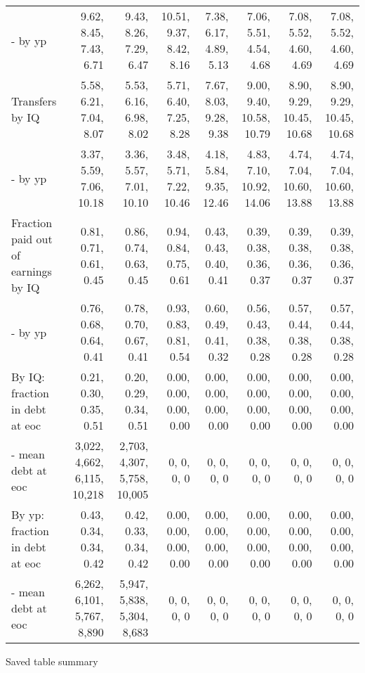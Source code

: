 \begin{tabular}{lrrrrrrr}
- by yp & 9.62, 8.45, 7.43, 6.71  & 9.43, 8.26, 7.29, 6.47  & 10.51, 9.37, 8.42, 8.16  & 7.38, 6.17, 4.89, 5.13  & 7.06, 5.51, 4.54, 4.68  & 7.08, 5.52, 4.60, 4.69  & 7.08, 5.52, 4.60, 4.69  \\ 
Transfers by IQ & 5.58, 6.21, 7.04, 8.07  & 5.53, 6.16, 6.98, 8.02  & 5.71, 6.40, 7.25, 8.28  & 7.67, 8.03, 9.28, 9.38  & 9.00, 9.40, 10.58, 10.79  & 8.90, 9.29, 10.45, 10.68  & 8.90, 9.29, 10.45, 10.68  \\ 
- by yp & 3.37, 5.59, 7.06, 10.18  & 3.36, 5.57, 7.01, 10.10  & 3.48, 5.71, 7.22, 10.46  & 4.18, 5.84, 9.35, 12.46  & 4.83, 7.10, 10.92, 14.06  & 4.74, 7.04, 10.60, 13.88  & 4.74, 7.04, 10.60, 13.88  \\ 
Fraction paid out of earnings by IQ & 0.81, 0.71, 0.61, 0.45  & 0.86, 0.74, 0.63, 0.45  & 0.94, 0.84, 0.75, 0.61  & 0.43, 0.43, 0.40, 0.41  & 0.39, 0.38, 0.36, 0.37  & 0.39, 0.38, 0.36, 0.37  & 0.39, 0.38, 0.36, 0.37  \\ 
- by yp & 0.76, 0.68, 0.64, 0.41  & 0.78, 0.70, 0.67, 0.41  & 0.93, 0.83, 0.81, 0.54  & 0.60, 0.49, 0.41, 0.32  & 0.56, 0.43, 0.38, 0.28  & 0.57, 0.44, 0.38, 0.28  & 0.57, 0.44, 0.38, 0.28  \\ 
By IQ: fraction in debt at eoc & 0.21, 0.30, 0.35, 0.51  & 0.20, 0.29, 0.34, 0.51  & 0.00, 0.00, 0.00, 0.00  & 0.00, 0.00, 0.00, 0.00  & 0.00, 0.00, 0.00, 0.00  & 0.00, 0.00, 0.00, 0.00  & 0.00, 0.00, 0.00, 0.00  \\ 
- mean debt at eoc & 3,022, 4,662, 6,115, 10,218  & 2,703, 4,307, 5,758, 10,005  & 0, 0, 0, 0  & 0, 0, 0, 0  & 0, 0, 0, 0  & 0, 0, 0, 0  & 0, 0, 0, 0  \\ 
By yp: fraction in debt at eoc & 0.43, 0.34, 0.34, 0.42  & 0.42, 0.33, 0.34, 0.42  & 0.00, 0.00, 0.00, 0.00  & 0.00, 0.00, 0.00, 0.00  & 0.00, 0.00, 0.00, 0.00  & 0.00, 0.00, 0.00, 0.00  & 0.00, 0.00, 0.00, 0.00  \\ 
- mean debt at eoc & 6,262, 6,101, 5,767, 8,890  & 5,947, 5,838, 5,304, 8,683  & 0, 0, 0, 0  & 0, 0, 0, 0  & 0, 0, 0, 0  & 0, 0, 0, 0  & 0, 0, 0, 0  \\ 
\hline
\end{tabular}%
Saved table summary

